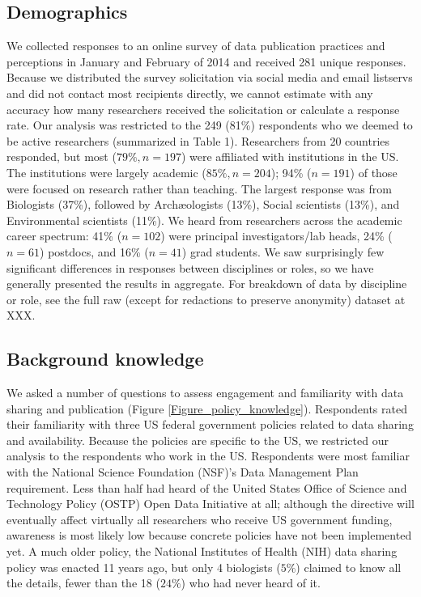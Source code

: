 \documentclass[10pt]{article}
\begin{document}
\subsection*{Demographics}

We collected responses to an online survey of data publication practices and perceptions in January and February of 2014 and received 281 unique responses.
Because we distributed the survey solicitation via social media and email listservs and did not contact most recipients directly, we cannot estimate with any accuracy how many researchers received the solicitation or calculate a response rate.
Our analysis was restricted to the 249 (81\%) respondents who we deemed to be active researchers (summarized in Table 1).
Researchers from 20 countries responded, but most ($79\%, n=197$) were affiliated with institutions in the US.
The institutions were largely academic ($85\%, n=204$); 94\% ($n=191$) of those were focused on research rather than teaching. 
The largest response was from Biologists (37\%), followed by Arch{\ae}ologists (13\%), Social scientists (13\%), and Environmental scientists (11\%).
We heard from researchers across the academic career spectrum: 41\% ($n=102$) were principal investigators/lab heads, 24\% ($n=61$) postdocs, and 16\% ($n=41$) grad students.
We saw surprisingly few significant differences in responses between disciplines or roles, so we 
have generally presented the results in aggregate.
For breakdown of data by discipline or role, see the full raw (except for redactions to preserve anonymity) dataset at XXX. 

\subsection*{Background knowledge}

We asked a number of questions to assess engagement and familiarity with data sharing and publication (Figure \ref{Figure_policy_knowledge}).
Respondents rated their familiarity with three US federal government policies related to data sharing and availability.
Because the policies are specific to the US, we restricted our analysis to the respondents who work in the US.
Respondents were most familiar with the National Science Foundation (NSF)'s Data Management Plan requirement\cite{national_science_foundation_gpg_2011}.
Less than half had heard of the United States Office of Science and Technology Policy (OSTP) Open Data Initiative\cite{obama_making_2013} at all; although the directive will eventually affect virtually all researchers who receive US government funding, awareness is most likely low because concrete policies have not been implemented yet. 
A much older policy, the National Institutes of Health (NIH) data sharing policy\cite{national_institutes_of_health_final_2003} was enacted 11 years ago, but only 4 biologists ($5\%$) claimed to know all the details, fewer than the 18 ($24\%$) who had never heard of it.
\end{document}
